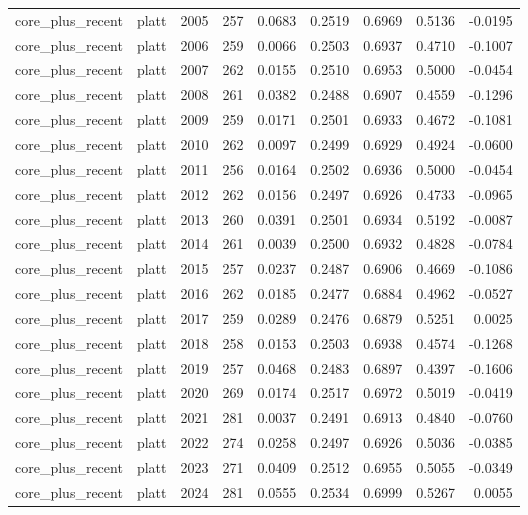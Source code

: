\begin{table}[t]
\begin{tabular}{@{} l l r r r r r r r @{} }
      core\_plus\_recent & platt & 2005 & 257 & 0.0683 & 0.2519 & 0.6969 & 0.5136 & -0.0195 \\
      core\_plus\_recent & platt & 2006 & 259 & 0.0066 & 0.2503 & 0.6937 & 0.4710 & -0.1007 \\
      core\_plus\_recent & platt & 2007 & 262 & 0.0155 & 0.2510 & 0.6953 & 0.5000 & -0.0454 \\
      core\_plus\_recent & platt & 2008 & 261 & 0.0382 & 0.2488 & 0.6907 & 0.4559 & -0.1296 \\
      core\_plus\_recent & platt & 2009 & 259 & 0.0171 & 0.2501 & 0.6933 & 0.4672 & -0.1081 \\
      core\_plus\_recent & platt & 2010 & 262 & 0.0097 & 0.2499 & 0.6929 & 0.4924 & -0.0600 \\
      core\_plus\_recent & platt & 2011 & 256 & 0.0164 & 0.2502 & 0.6936 & 0.5000 & -0.0454 \\
      core\_plus\_recent & platt & 2012 & 262 & 0.0156 & 0.2497 & 0.6926 & 0.4733 & -0.0965 \\
      core\_plus\_recent & platt & 2013 & 260 & 0.0391 & 0.2501 & 0.6934 & 0.5192 & -0.0087 \\
      core\_plus\_recent & platt & 2014 & 261 & 0.0039 & 0.2500 & 0.6932 & 0.4828 & -0.0784 \\
      core\_plus\_recent & platt & 2015 & 257 & 0.0237 & 0.2487 & 0.6906 & 0.4669 & -0.1086 \\
      core\_plus\_recent & platt & 2016 & 262 & 0.0185 & 0.2477 & 0.6884 & 0.4962 & -0.0527 \\
      core\_plus\_recent & platt & 2017 & 259 & 0.0289 & 0.2476 & 0.6879 & 0.5251 & 0.0025 \\
      core\_plus\_recent & platt & 2018 & 258 & 0.0153 & 0.2503 & 0.6938 & 0.4574 & -0.1268 \\
      core\_plus\_recent & platt & 2019 & 257 & 0.0468 & 0.2483 & 0.6897 & 0.4397 & -0.1606 \\
      core\_plus\_recent & platt & 2020 & 269 & 0.0174 & 0.2517 & 0.6972 & 0.5019 & -0.0419 \\
      core\_plus\_recent & platt & 2021 & 281 & 0.0037 & 0.2491 & 0.6913 & 0.4840 & -0.0760 \\
      core\_plus\_recent & platt & 2022 & 274 & 0.0258 & 0.2497 & 0.6926 & 0.5036 & -0.0385 \\
      core\_plus\_recent & platt & 2023 & 271 & 0.0409 & 0.2512 & 0.6955 & 0.5055 & -0.0349 \\
      core\_plus\_recent & platt & 2024 & 281 & 0.0555 & 0.2534 & 0.6999 & 0.5267 & 0.0055 \\

\end{tabular}
\end{table}
